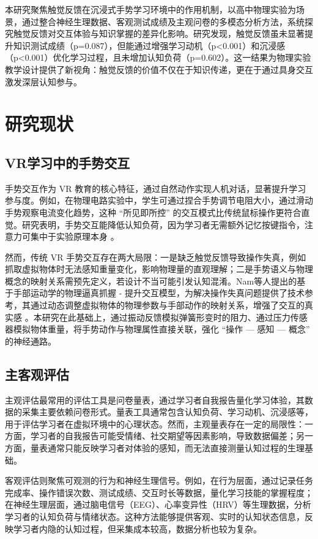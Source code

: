 \documentclass[runningheads]{llncs}
\begin{document}
本研究聚焦触觉反馈在沉浸式手势学习环境中的作用机制，以高中物理实验为场景，通过整合神经生理数据、客观测试成绩及主观问卷的多模态分析方法，系统探究触觉反馈对交互体验与知识掌握的差异化影响。研究发现，触觉反馈虽未显著提升知识测试成绩（p=0.087），但能通过增强学习动机（p<0.001）和沉浸感（p<0.001）优化学习过程，且未增加认知负荷（p=0.602）。这一结果为物理实验教学设计提供了新视角：触觉反馈的价值不仅在于知识传递，更在于通过具身交互激发深层认知参与。


\section{研究现状}
\subsection{VR学习中的手势交互} 

手势交互作为 VR 教育的核心特征，通过自然动作实现人机对话，显著提升学习参与度。例如，在物理电路实验中，学生可通过捏合手势调节电阻大小，通过滑动手势观察电流变化趋势，这种 “所见即所控” 的交互模式比传统鼠标操作更符合直觉。研究表明，手势交互能降低认知负荷，因为学习者无需额外记忆按键指令，注意力可集中于实验原理本身 \cite {hostetter2023comparing}。

然而，传统 VR 手势交互存在两大局限：一是缺乏触觉反馈导致操作失真，例如抓取虚拟物体时无法感知重量变化，影响物理量的直观理解；二是手势语义与物理概念的映射关系需预先定义，若设计不当可能引发认知混淆。Nam等人提出的基于手部运动学的物理逼真抓握 - 提升交互模型，为解决操作失真问题提供了技术参考，其通过动态调整虚拟物体的物理参数与手部动作的映射关系，增强了交互的真实感 \cite {nam2023physically}。本研究在此基础上，通过振动反馈模拟弹簧形变时的阻力、通过压力传感器模拟物体重量，将手势动作与物理属性直接关联，强化 “操作 — 感知 — 概念” 的神经通路。

\subsection{主客观评估}
主观评估最常用的评估工具是问卷量表，通过学习者自我报告量化学习体验，其数据的采集主要依赖问卷形式。量表工具通常包含认知负荷\cite{sweller1988cognitive}、学习动机\cite{keller1987development}、沉浸感\cite{sherman2003understanding}等，用于评估学习者在虚拟环境中的心理状态。然而，主观量表存在一定的局限性：一方面，学习者的自我报告可能受情绪、社交期望等因素影响，导致数据偏差；另一方面，量表通常只能反映学习者对体验的感知，而无法直接测量认知过程的生理基础\cite{solano2024interoceptive}。

客观评估则聚焦可观测的行为\cite{Mayer01012003}和神经生理信号。例如，在行为层面，通过记录任务完成率、操作错误次数、测试成绩、交互时长等数据，量化学习技能的掌握程度；在神经生理层面，通过脑电信号（EEG）、心率变异性（HRV）等生理数据，分析学习者的认知负荷与情绪状态。\cite{liu2023fusion,brugnera2016cortical,kobayashi2025pilot}这种方法能够提供客观、实时的认知状态信息，反映学习者内隐的认知过程，但采集成本较高，数据分析也较为复杂\cite{diarra2025systematic}。
\end{document}
